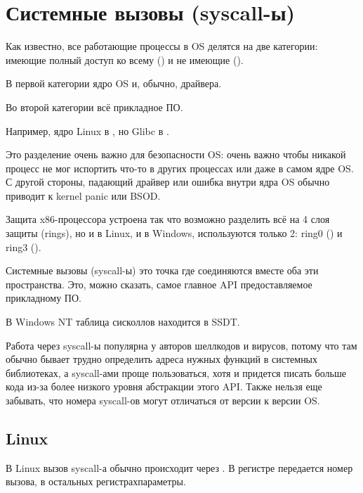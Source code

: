 \section{Системные вызовы (syscall-ы)}

\label{syscalls}

Как известно, все работающие процессы в \ac{OS} делятся на две категории:
имеющие полный доступ ко всему  () 
и не имеющие ().

В первой категории ядро \ac{OS} и, обычно, драйвера.

Во второй категории всё прикладное ПО.


Например, ядро Linux в , но Glibc в .

Это разделение очень важно для безопасности \ac{OS}:
очень важно чтобы никакой процесс не мог испортить что-то в других процессах
или даже в самом ядре \ac{OS}.
С другой стороны, падающий драйвер или ошибка внутри ядра \ac{OS} обычно приводит к kernel panic или \ac{BSOD}.

Защита x86-процессора устроена так что возможно разделить всё на 4 слоя защиты (rings), но и в Linux,
и в Windows, используются только 2: ring0 () и ring3 ().

Системные вызовы (syscall-ы)
это точка где соединяются вместе оба эти пространства.
Это, можно сказать, самое главное \ac{API} предоставляемое прикладному ПО.

В \gls{Windows NT} таблица сисколлов находится в \ac{SSDT}.

Работа через syscall-ы популярна у авторов шеллкодов и вирусов,
потому что там обычно бывает трудно определить адреса нужных функций в системных библиотеках,
а syscall-ами проще пользоваться, хотя и придется писать больше
кода из-за более низкого уровня абстракции этого \ac{API}.
Также нельзя еще забывать, что номера syscall-ов могут отличаться от версии к версии OS.

\subsection{Linux}
\label{linux_syscall}

В Linux вызов syscall-а обычно происходит через .
В регистре \EAX передается номер вызова,
в остальных регистрах\EMDASH{}параметры.


